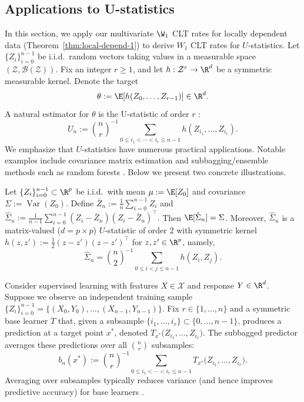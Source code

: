\documentclass[mnsc,nonblindrev]{informs3}
\begin{document}
\subsection{Applications to U-statistics}\label{sec:U}
In this section, we apply our multivariate  $\W_1$ CLT rates for locally dependent data
(Theorem~\ref{thm:local-depend-1}) to derive $W_1$ CLT rates for $U$-statistics. Let $\{Z_i\}_{i=0}^{n-1}$ be i.i.d.\ random vectors taking values in a measurable space
$(\mathcal Z,\mathcal B(\mathcal Z))$. Fix an integer $r\ge1$, and let
$h:\mathcal Z^{r}\to\R^d$ be a symmetric measurable kernel. Denote the target
\[
\theta := \E[h(Z_0,\dots,Z_{r-1})]\in\R^d .
\]
A natural estimator for $\theta$ is the U-statistic of order $r$ \citep{hoeffding1992class}:
\begin{equation}\label{eq:U}
U_n := \binom{n}{r}^{-1}
\sum_{0\le i_1<\cdots<i_r\le n-1} h\left(Z_{i_1},\ldots,Z_{i_r}\right).
\end{equation}
We emphasize that $U$-statistics have numerous practical applications. Notable examples
include covariance matrix estimation
\citep{dempster1972covariance,bickel2008covariance,bickel2008regularized}
and subbagging/ensemble methods such as random forests
\citep{breiman1996bagging,breiman2001random,mentch2016quantifying}.
Below we present two concrete illustrations.
\begin{example}\label{example:sample-covariance}
Let $\{Z_i\}_{i=0}^{n-1}\subset\R^p$ be i.i.d.\ with mean $\mu:=\E[Z_0]$ and covariance
$\Sigma:=\operatorname{Var}(Z_0)$. Define $\bar Z_n:=\frac{1}{n}\sum_{i=0}^{n-1} Z_i$ and $\hat\Sigma_n:=\frac{1}{n-1}\sum_{i=0}^{n-1}(Z_i-\bar Z_n)(Z_i-\bar Z_n)^\top .$ Then $\E[\hat\Sigma_n]=\Sigma$. Moreover, $\hat\Sigma_n$ is a matrix-valued ($d=p\times p$) $U$-statistic of order
$2$ with symmetric kernel
$h(z,z'):=\frac{1}{2}(z-z')(z-z')^\top$ for $z,z'\in\R^p$, namely,
\[
\hat\Sigma_n
=
\binom{n}{2}^{-1}\sum_{0\le i<j\le n-1} h(Z_i,Z_j).
\]

\end{example}
\begin{example}\label{example:subbagging}
Consider supervised learning with features \(X\in\mathcal X\) and response \(Y\in\R^d\).
Suppose we observe an independent training sample  \(\{Z_i\}_{i=0}^{n-1} = \{(X_0,Y_0),\ldots,(X_{n-1},Y_{n-1})\}\).
Fix \(r\in\{1,\ldots,n\}\) and a symmetric base learner \(T\) that, given a subsample
\(\{i_1,\ldots,i_r\}\subset\{0,\ldots,n-1\}\), produces a prediction at a target point
\(x^*\), denoted $T_{x^*}\big(Z_{i_1},\dots, Z_{i_r}\big).$ The subbagged predictor \citep{breiman2001random,mentch2016quantifying} averages these
predictions over all \(\binom{n}{r}\) subsamples:
\[
b_n(x^*)
:= \binom{n}{r}^{-1}
   \sum_{0\le i_1<\cdots<i_r\le n-1}
   T_{x^*}\big(Z_{i_1},\dots, Z_{i_r}\big).
\]
Averaging over subsamples typically reduces variance (and hence improves predictive accuracy)
for base learners \citep{breiman1996bagging}.
\end{example}
\end{document}

